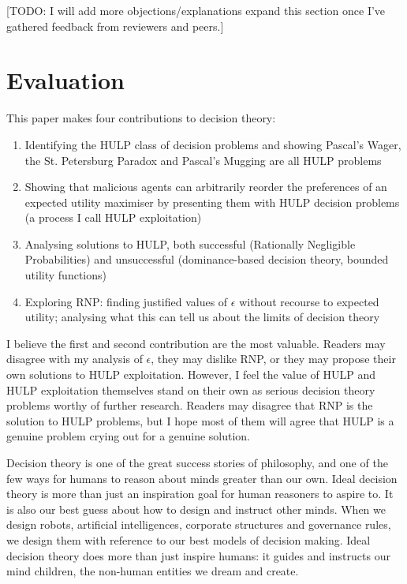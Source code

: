 \documentclass{article}
\begin{document}
[TODO: I will add more objections/explanations expand this section once I've gathered feedback from reviewers and peers.]

\section{Evaluation}
This paper makes four contributions to decision theory:

\begin{enumerate}
\item Identifying the HULP class of decision problems and showing Pascal's Wager, the St. Petersburg Paradox and Pascal's Mugging are all HULP problems
\item Showing that malicious agents can arbitrarily reorder the preferences of an expected utility maximiser by presenting them with HULP decision problems (a process I call HULP exploitation)
\item Analysing solutions to HULP, both successful (Rationally Negligible Probabilities) and unsuccessful (dominance-based decision theory, bounded utility functions)
\item Exploring RNP: finding justified values of \(\epsilon\) without recourse to expected utility; analysing what this can tell us about the limits of decision theory
\end{enumerate}

I believe the first and second contribution are the most valuable. Readers may disagree with my analysis of \(\epsilon\), they may dislike RNP, or they may propose their own solutions to HULP exploitation. However, I feel the value of HULP and HULP exploitation themselves stand on their own as serious decision theory problems worthy of further research. Readers may disagree that RNP is the solution to HULP problems, but I hope most of them will agree that HULP is a genuine problem crying out for a genuine solution.

Decision theory is one of the great success stories of philosophy, and one of the few ways for humans to reason about minds greater than our own. Ideal decision theory is more than just an inspiration goal for human reasoners to aspire to. It is also our best guess about how to design and instruct other minds. When we design robots, artificial intelligences, corporate structures and governance rules, we design them with reference to our best models of decision making. Ideal decision theory does more than just inspire humans: it guides and instructs our mind children, the non-human entities we dream and create. 
\end{document}
